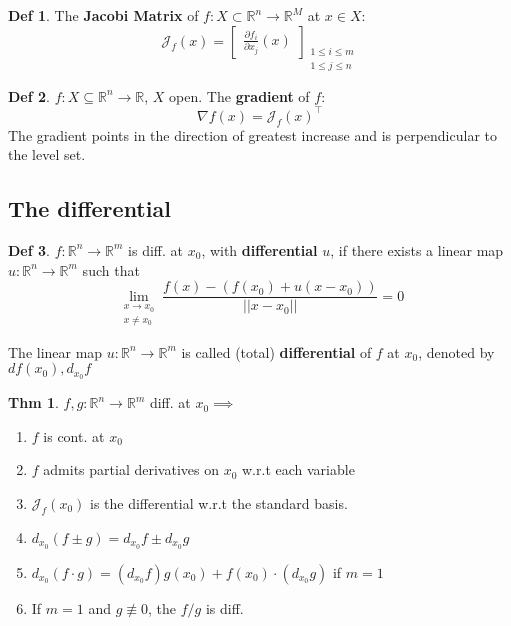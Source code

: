 \documentclass[a4paper, 10pt]{article}
\theoremstyle{definition}
\newtheorem*{theorem}{Thm}
\newtheorem*{definition}{Def}
\newcommand{\R}{\mathbb{R}}
\newcommand{\J}{\mathcal{J}}
\begin{document}
\begin{definition}
    The \textbf{Jacobi Matrix} of \(f: X \subset \R^n \to \R^M\) at \(x \in X\):
    \[\J_f(x) = \begin{bmatrix}
        \frac{\partial f_i}{\partial x_j}(x)
    \end{bmatrix}_{\substack{1 \leq i \leq m \\ 1 \leq j \leq n}}\]
\end{definition}

\begin{definition}
    \(f: X \subseteq \R^n \to \R\), \(X\) open. The \textbf{gradient} of \(f\):
    \[\nabla f(x) = \J_f(x)^\top\]
    The gradient points in the direction of greatest increase and is perpendicular to the level set.
\end{definition}

\subsection{The differential}
\begin{definition}
    \(f: \R^n \to \R^m\) is diff. at \(x_0\), with \textbf{differential} \(u\), if there exists a linear map \(u: \R^n \to \R^m\) such that
    \[\lim_{\substack{x \to x_0 \\ x \neq x_0}} \frac{f(x) - (f(x_0) + u(x - x_0))}{||x-x_0||} = 0\]

    The linear map \(u: \R^n \to \R^m\) is called (total) \textbf{differential} of \(f\) at \(x_0\), denoted by \(df(x_0), d_{x_0}f\)
\end{definition}

\begin{theorem}
    \(f, g: \R^n \to \R^m\) diff. at \(x_0 \implies\)
    \begin{enumerate}
        \item \(f\) is cont. at \(x_0\)
        \item \(f\) admits partial derivatives on \(x_0\) w.r.t each variable
        \item \(\J_f(x_0)\) is the differential w.r.t the standard basis.
        \item \(d_{x_0}(f \pm g) = d_{x_0}f \pm d_{x_0}g\)
        \item \(d_{x_0}(f \cdot g) = (d_{x_0}f)g(x_0) + f(x_0) \cdot (d_{x_0} g)\) if \(m = 1\)
        \item If \(m = 1\) and \(g \not\equiv 0\), the \(f / g\) is diff.
    \end{enumerate}
\end{theorem}
\end{document}

